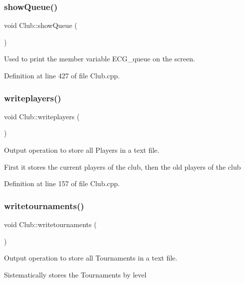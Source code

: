 \subsubsection{\texorpdfstring{show\+Queue()}{showQueue()}}
{\footnotesize\ttfamily void Club\+::show\+Queue (\begin{DoxyParamCaption}{ }\end{DoxyParamCaption})}



Used to print the member variable E\+C\+G\+\_\+queue on the screen. 



Definition at line 427 of file Club.\+cpp.

\hypertarget{class_club_acc8a8c5175c6f90db4056dd6a1e98b67}{}\label{class_club_acc8a8c5175c6f90db4056dd6a1e98b67} 
\subsubsection{\texorpdfstring{writeplayers()}{writeplayers()}}
{\footnotesize\ttfamily void Club\+::writeplayers (\begin{DoxyParamCaption}{ }\end{DoxyParamCaption})}



Output operation to store all Players in a text file. 

First it stores the current players of the club, then the old players of the club 

Definition at line 157 of file Club.\+cpp.

\hypertarget{class_club_a89dfe233c69897a1d5abd9d7951990d8}{}\label{class_club_a89dfe233c69897a1d5abd9d7951990d8} 
\subsubsection{\texorpdfstring{writetournaments()}{writetournaments()}}
{\footnotesize\ttfamily void Club\+::writetournaments (\begin{DoxyParamCaption}{ }\end{DoxyParamCaption})}



Output operation to store all Tournaments in a text file. 

Sistematically stores the Tournaments by level 

